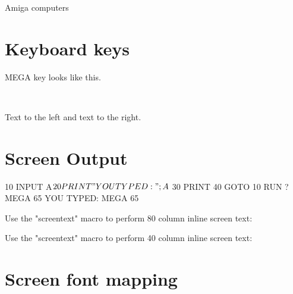 Amiga\texttrademark{} computers

\section{Keyboard keys}

\megasymbolkey MEGA key looks like this.

\\

Text to the left  and text to the right.

    \megakey{ } 

\megakey{*} \megakey{$\leftarrow$} \megakey{$\uparrow$} \megakey{$\rightarrow$} \megakey{$\downarrow$}

\section{Screen Output}

\begin{screencode}
	10 INPUT A$
	20 PRINT "YOU TYPED: ";A$
	30 PRINT
	40 GOTO 10
	RUN
	? MEGA 65
	YOU TYPED: MEGA 65
\end{screencode}


Use the "screentext" macro to perform 80 column inline screen text:

Use the "screentext" macro to perform 40 column inline screen text:

\section{Screen font mapping}


